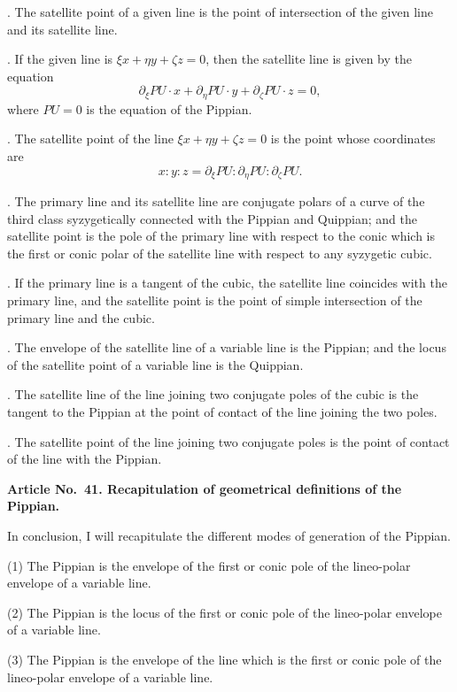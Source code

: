 \documentclass[11pt,a4paper]{book}
\begin{document}
\begin{center}
. The satellite point of a given line is the point of
intersection of the given line and its satellite line.

. If the given line is $\xi x + \eta y + \zeta z = 0$, then the
satellite line is given by the equation
\[
\partial_{\xi}PU \cdot x + \partial_{\eta}PU \cdot y + \partial_{\zeta}PU \cdot z = 0,
\]
where $PU = 0$ is the equation of the Pippian.

. The satellite point of the line $\xi x + \eta y + \zeta z = 0$
is the point whose coordinates are
\[
x : y : z = \partial_{\xi}PU : \partial_{\eta}PU : \partial_{\zeta}PU.
\]

. The primary line and its satellite line are conjugate
polars of a curve of the third class syzygetically connected
with the Pippian and Quippian; and the satellite point is the
pole of the primary line with respect to the conic which is the
first or conic polar of the satellite line with respect to any
syzygetic cubic.

. If the primary line is a tangent of the cubic, the satellite
line coincides with the primary line, and the satellite point is
the point of simple intersection of the primary line and the cubic.

. The envelope of the satellite line of a variable line is
the Pippian; and the locus of the satellite point of a variable
line is the Quippian.

. The satellite line of the line joining two conjugate poles
of the cubic is the tangent to the Pippian at the point of contact
of the line joining the two poles.

. The satellite point of the line joining two conjugate
poles is the point of contact of the line with the Pippian.

\medskip\noindent\textbf{Article No.~41. Recapitulation of geometrical definitions of the Pippian.}

\medskip
In conclusion, I will recapitulate the different modes of
generation of the Pippian.

\smallskip
\hspace*{2em}(1) The Pippian is the envelope of the first or conic pole
of the lineo-polar envelope of a variable line.

\hspace*{2em}(2) The Pippian is the locus of the first or conic pole of
the lineo-polar envelope of a variable line.

\hspace*{2em}(3) The Pippian is the envelope of the line which is the
first or conic pole of the lineo-polar envelope of a variable line.


\end{center}
\end{document}
